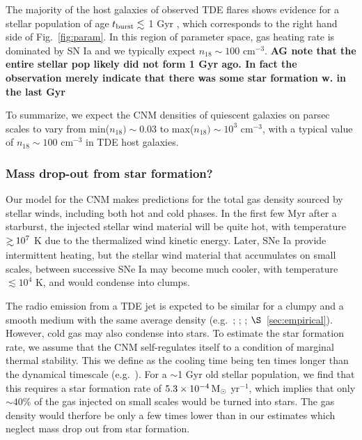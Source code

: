 \documentclass[usenatbib,fleqn]{mnras}
\newcommand\gsim{\mathrel{\rlap{\lower4pt\hbox{\hskip1pt$\sim$}}
    \raise1pt\hbox{$>$}}}
\newcommand{\Msun}{{\rm M_\odot}}
\begin{document}
The majority of the host galaxies of observed TDE flares shows
evidence for a stellar population of age $t_{\rm burst} \lesssim$ 1
Gyr \citep{French+2016}, which corresponds to the right hand side of
Fig.~\ref{fig:param}. In this region of parameter space, gas heating
rate is dominated by SN Ia and we typically expect $n_{18}\sim 100$
cm$^{-3}$. {\bf AG note that the entire stellar pop likely did not
  form 1 Gyr ago. In fact the observation merely indicate that there
  was some star formation w. in the last Gyr}

To summarize, we expect the CNM densities of quiescent galaxies on
parsec scales to vary from min($n_{18}) \sim 0.03$ to max($n_{18})\sim
10^{3}$ cm$^{-3}$, with a typical value of $n_{18}\sim 100$ cm$^{-3}$
in TDE host galaxies.

\subsubsection{Mass drop-out from star formation?}

Our model for the CNM makes predictions for the total gas density
sourced by stellar winds, including both hot and cold phases.  In the
first few Myr after a starburst, the injected stellar wind material
will be quite hot, with temperature $\gsim 10^{7}$ K due to the
thermalized wind kinetic energy.  Later, SNe Ia provide intermittent
heating, but the stellar wind material that accumulates on small
scales, between successive SNe Ia may become much cooler, with
temperature $\lesssim 10^{4}$ K, and would condense into clumps.

The radio emission from a TDE jet is expcted to be similar for a
clumpy and a smooth medium with the same average density
(e.g.~\citealt{Nakar&Granot2007}; \citealt{Mimica&Giannios2009};
\citealt{vanEerten+2009}; $\S$~\ref{sec:empirical}).  However, cold gas
may also condense into stars.  To estimate the star formation rate, we
assume that the CNM self-regulates itself to a condition of marginal
thermal stability.  This we define as the cooling time being ten times
longer than the dynamical timescale (e.g.~\citealt{McCourt+09}). For a
$\sim$1 Gyr old stellar population, we find that this requires a star
formation rate of $5.3 \times 10^{-4} \,\Msun$ yr$^{-1}$, which
implies that only $\sim 40$\% of the gas injected on small scales
would be turned into stars.  The gas density would therfore be only a
few times lower than in our estimates which neglect mass drop out from
star formation.
\end{document}
